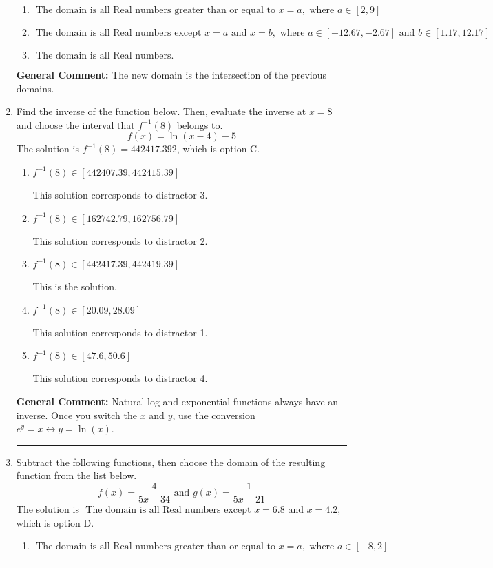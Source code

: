 \documentclass{extbook}[14pt]
\newcommand{\litem}[1]{\item #1

\rule{\textwidth}{0.4pt}}
\begin{document}
\begin{enumerate}
{\begin{enumerate}[label=\Alph*.]
\item \( \text{ The domain is all Real numbers greater than or equal to } x = a, \text{ where } a \in [2, 9] \)


\item \( \text{ The domain is all Real numbers except } x = a \text{ and } x = b, \text{ where } a \in [-12.67, -2.67] \text{ and } b \in [1.17, 12.17] \)


\item \( \text{ The domain is all Real numbers. } \)


\end{enumerate}

\textbf{General Comment:} The new domain is the intersection of the previous domains.
}
\litem{
Find the inverse of the function below. Then, evaluate the inverse at $x = 8$ and choose the interval that $f^{-1}(8)$ belongs to.
\[ f(x) = \ln{(x-4)}-5 \]The solution is \( f^{-1}(8) = 442417.392 \), which is option C.\begin{enumerate}[label=\Alph*.]
\item \( f^{-1}(8) \in [442407.39, 442415.39] \)

 This solution corresponds to distractor 3.
\item \( f^{-1}(8) \in [162742.79, 162756.79] \)

 This solution corresponds to distractor 2.
\item \( f^{-1}(8) \in [442417.39, 442419.39] \)

 This is the solution.
\item \( f^{-1}(8) \in [20.09, 28.09] \)

 This solution corresponds to distractor 1.
\item \( f^{-1}(8) \in [47.6, 50.6] \)

 This solution corresponds to distractor 4.
\end{enumerate}

\textbf{General Comment:} Natural log and exponential functions always have an inverse. Once you switch the $x$ and $y$, use the conversion $ e^y = x \leftrightarrow y=\ln(x)$.
}
\litem{
Subtract the following functions, then choose the domain of the resulting function from the list below.
\[ f(x) = \frac{4}{5x-34} \text{ and } g(x) = \frac{1}{5x-21} \]The solution is \( \text{ The domain is all Real numbers except } x = 6.8 \text{ and } x = 4.2 \), which is option D.\begin{enumerate}[label=\Alph*.]
\item \( \text{ The domain is all Real numbers greater than or equal to } x = a, \text{ where } a \in [-8, 2] \)



\end{enumerate}}
\end{enumerate}
\end{document}
